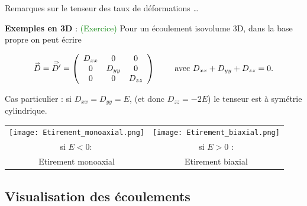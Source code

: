 \begin{frame}{Remarques sur le tenseur des taux de déformations  \ldots}
\small


\medskip
\pause
{\bf Exemples en 3D } :   \textcolor{green}{(Exercice)}
Pour un écoulement isovolume 3D, dans la base propre on peut écrire 
 
\[
\accentset{\Rightarrow}{D} = \accentset{\Rightarrow}{D'} = 
	\left(
	\begin{array}{ccc}
		D_{xx} & 0 & 0 
		\\
		0 & D_{yy} & 0
		\\
		0 & 0 & D_{zz}
	\end{array}
	\right)
\qquad \mbox{ avec } D_{xx}+ D_{yy} + D_{zz} = 0.
\]

Cas particulier : si $D_{xx} = D_{yy} = E$, (et donc $D_{zz} = -2 E$) le tenseur est à symétrie cylindrique.

\begin{center}
\begin{tabular}{cc}
	\texttt{[image: Etirement\_monoaxial.png]}
	&
	\texttt{[image: Etirement\_biaxial.png]}\\
	si $E <0 :$ & si $E>0$  :
	\\ 
	Etirement monoaxial & 
	Etirement biaxial
	\end{tabular}
\end{center}

\end{frame}


\subsection{Visualisation des \'ecoulements}


